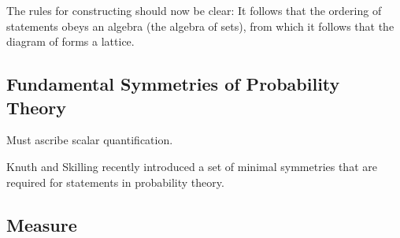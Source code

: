 {The rules for constructing  should now be clear:
It follows that the ordering of statements obeys an algebra (the algebra of sets),
from which it follows that the diagram of  forms a lattice.



\subsection{Fundamental Symmetries of Probability Theory}
Must ascribe scalar quantification.


Knuth and Skilling\cite{Knuth2010} recently introduced a set of  minimal symmetries that are required for statements in probability theory.


\subsection{Measure}


}
